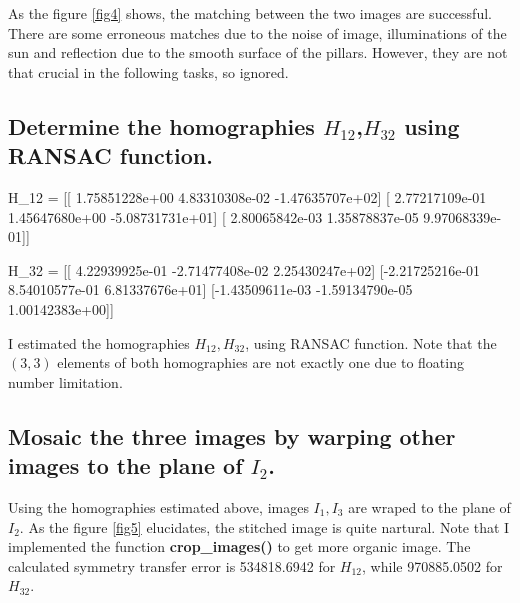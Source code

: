 \documentclass[10pt]{article}
\begin{document}
As the figure \ref{fig4} shows, the matching between the two images are successful. 
There are some erroneous matches due to the noise of image, illuminations of the sun and reflection due to the smooth surface of the pillars. However, they are not that crucial in the following tasks, so ignored.

\subsection*{Determine the homographies $H_{12}$,$H_{32}$ using RANSAC function.}

\begin{python}
H_12 = [[ 1.75851228e+00  4.83310308e-02 -1.47635707e+02]
 [ 2.77217109e-01  1.45647680e+00 -5.08731731e+01]
 [ 2.80065842e-03  1.35878837e-05  9.97068339e-01]]

H_32 = [[ 4.22939925e-01 -2.71477408e-02  2.25430247e+02]
 [-2.21725216e-01  8.54010577e-01  6.81337676e+01]
 [-1.43509611e-03 -1.59134790e-05  1.00142383e+00]]
\end{python}

I estimated the homographies $H_{12}, H_{32}$, using RANSAC function. 
Note that the $(3,3)$ elements of both homographies are not exactly one due to floating number limitation. 

\subsection*{Mosaic the three images by warping other images to the plane of $I_2$.}
Using the homographies estimated above, images $I_1, I_3$ are wraped to the plane of $I_2$. As the figure \ref{fig5} elucidates, the stitched image is quite nartural. Note that I implemented the function \textbf{crop\_images()} to get more organic image. 
The calculated symmetry transfer error is 534818.6942 for $H_{12}$, while 970885.0502 for $H_{32}$.
\end{document}
